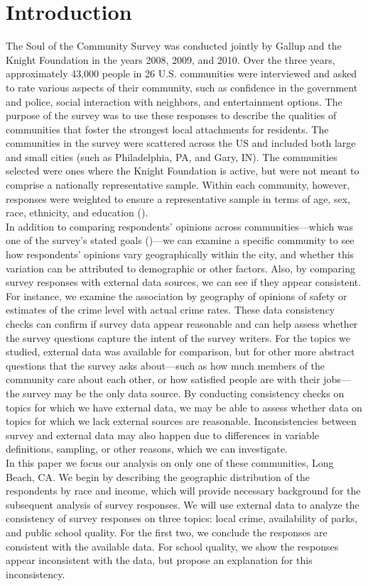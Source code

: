 \section{Introduction}
\label{intro}

The Soul of the Community Survey was conducted jointly by Gallup and the Knight Foundation in the years 2008, 2009, and 2010.  Over the three years, approximately 43,000 people in 26 U.S. communities were interviewed and asked to rate various aspects of their community, such as confidence in the government and police, social interaction with neighbors, and entertainment options.  The purpose of the survey was to use these responses to describe the qualities of communities that foster the strongest local attachments for residents.  The communities in the survey were scattered across the US and included both large and small cities (such as Philadelphia, PA, and Gary, IN).  The communities selected were ones where the Knight Foundation is active, but were not meant to comprise a nationally representative sample.  Within each community, however, responses were weighted to ensure a representative sample in terms of age, sex, race, ethnicity, and education (\citealt{KFDoc}).\\
\indent
In addition to comparing respondents' opinions across communities---which was one of the survey's stated goals (\citealt[p. 10]{KFReport})---we can examine a specific community to see how respondents' opinions vary geographically within the city, and whether this variation can be attributed to demographic or other factors.
Also, by comparing survey responses with external data sources, we can see if they appear consistent.  For instance, we examine the association by geography of opinions of safety or estimates of the crime level with actual crime rates.  These data consistency checks can confirm if survey data appear reasonable and can help assess whether the survey questions capture the intent of the survey writers.  For the topics we studied, external data was available for comparison, but for other more abstract questions that the survey asks about---such as how much members of the community care about each other, or how satisfied people are with their jobs---the survey may be the only data source.  By conducting consistency checks on topics for which we have external data, we may be able to assess whether data on topics for which we lack external sources are reasonable.  Inconsistencies between survey and external data may also happen due to differences in variable definitions, sampling, or other reasons, which we can investigate.\\
\indent
In this paper we focus our analysis on only one of these communities, Long Beach, CA.  We begin by describing the geographic distribution of the respondents by race and income, which will provide necessary background for the subsequent analysis of survey responses.  We will use external data to analyze the consistency of survey responses on three topics: local crime, availability of parks, and public school quality.  For the first two, we conclude the responses are consistent with the available data.  For school quality, we show the responses appear inconsistent with the data, but propose an explanation for this inconsistency.


